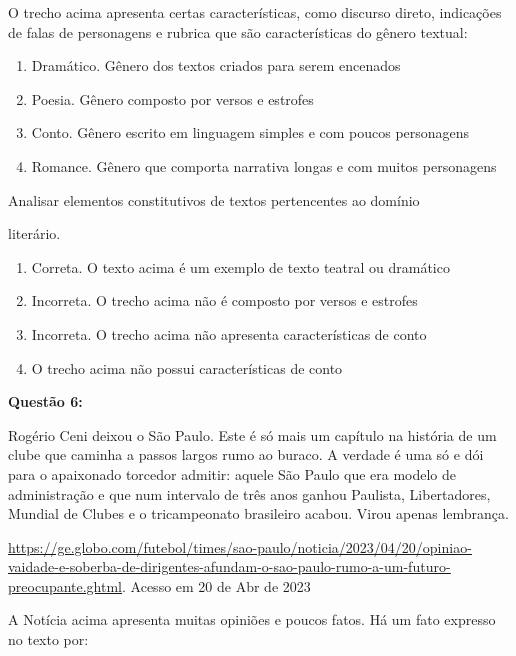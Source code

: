 {O trecho acima apresenta certas características, como discurso direto,
indicações de falas de personagens e rubrica que são características do
gênero textual:

\begin{enumerate}
\def\labelenumi{\alph{enumi})}
\item
  Dramático. Gênero dos textos criados para serem encenados
\item
  Poesia. Gênero composto por versos e estrofes
\item
  Conto. Gênero escrito em linguagem simples e com poucos personagens
\item
  Romance. Gênero que comporta narrativa longas e com muitos personagens
\end{enumerate}

Analisar elementos constitutivos de textos pertencentes ao domínio

literário.

\begin{enumerate}
\def\labelenumi{\arabic{enumi}.}
\item
  Correta. O texto acima é um exemplo de texto teatral ou dramático
\item
  Incorreta. O trecho acima não é composto por versos e estrofes
\item
  Incorreta. O trecho acima não apresenta características de conto
\item
  O trecho acima não possui características de conto
\end{enumerate}

\textbf{Questão 6:}

Rogério Ceni deixou o São Paulo. Este é só mais um capítulo na história
de um clube que caminha a passos largos rumo ao buraco. A verdade é uma
só e dói para o apaixonado torcedor admitir: aquele São Paulo que era
modelo de administração e que num intervalo de três anos ganhou
Paulista, Libertadores, Mundial de Clubes e o tricampeonato brasileiro
acabou. Virou apenas lembrança.

\href{https://ge.globo.com/futebol/times/sao-paulo/noticia/2023/04/20/opiniao-vaidade-e-soberba-de-dirigentes-afundam-o-sao-paulo-rumo-a-um-futuro-preocupante.ghtml}{\uline{https://ge.globo.com/futebol/times/sao-paulo/noticia/2023/04/20/opiniao-vaidade-e-soberba-de-dirigentes-afundam-o-sao-paulo-rumo-a-um-futuro-preocupante.ghtml}}.
Acesso em 20 de Abr de 2023

A Notícia acima apresenta muitas opiniões e poucos fatos. Há um fato
expresso no texto por:

}
